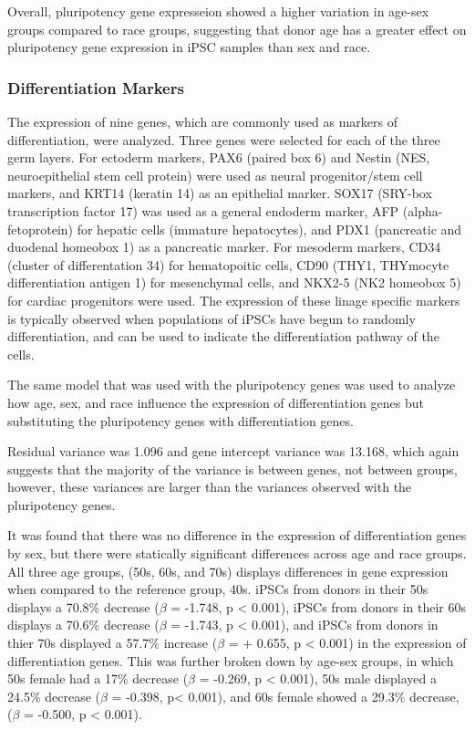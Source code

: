 \documentclass[
  letterpaper,
  DIV=11,
  numbers=noendperiod]{scrartcl}
\begin{document}
Overall, pluripotency gene expresseion showed a higher variation in
age-sex groups compared to race groups, suggesting that donor age has a
greater effect on pluripotency gene expression in iPSC samples than sex
and race.

\subsubsection{Differentiation Markers}\label{differentiation-markers}

The expression of nine genes, which are commonly used as markers of
differentiation, were analyzed. Three genes were selected for each of
the three germ layers. For ectoderm markers, PAX6 (paired box 6) and
Nestin (NES, neuroepithelial stem cell protein) were used as neural
progenitor/stem cell markers, and KRT14 (keratin 14) as an epithelial
marker. SOX17 (SRY-box transcription factor 17) was used as a general
endoderm marker, AFP (alpha-fetoprotein) for hepatic cells (immature
hepatocytes), and PDX1 (pancreatic and duodenal homeobox 1) as a
pancreatic marker. For mesoderm markers, CD34 (cluster of differentation
34) for hematopoitic cells, CD90 (THY1, THYmocyte differentiation
antigen 1) for mesenchymal cells, and NKX2-5 (NK2 homeobox 5) for
cardiac progenitors were used. The expression of these linage specific
markers is typically observed when populations of iPSCs have begun to
randomly differentiation, and can be used to indicate the
differentiation pathway of the cells.

The same model that was used with the pluripotency genes was used to
analyze how age, sex, and race influence the expression of
differentiation genes but substituting the pluripotency genes with
differentiation genes.

Residual variance was 1.096 and gene intercept variance was 13.168,
which again suggests that the majority of the variance is between genes,
not between groups, however, these variances are larger than the
variances observed with the pluripotency genes.

It was found that there was no difference in the expression of
differentiation genes by sex, but there were statically significant
differences across age and race groups. All three age groups, (50s, 60s,
and 70s) displays differences in gene expression when compared to the
reference group, 40s. iPSCs from donors in their 50s displays a 70.8\%
decrease (\(\beta\) = -1.748, p \textless{} 0.001), iPSCs from donors in
their 60s displays a 70.6\% decrease (\(\beta\) = -1.743, p \textless{}
0.001), and iPSCs from donors in thier 70s displayed a 57.7\% increase
(\(\beta\) = + 0.655, p \textless{} 0.001) in the expression of
differentiation genes. This was further broken down by age-sex groups,
in which 50s female had a 17\% decrease (\(\beta\) = -0.269, p
\textless{} 0.001), 50s male displayed a 24.5\% decrease (\(\beta\) =
-0.398, p\textless{} 0.001), and 60s female showed a 29.3\% decrease,
(\(\beta\) = -0.500, p \textless{} 0.001).
\end{document}
